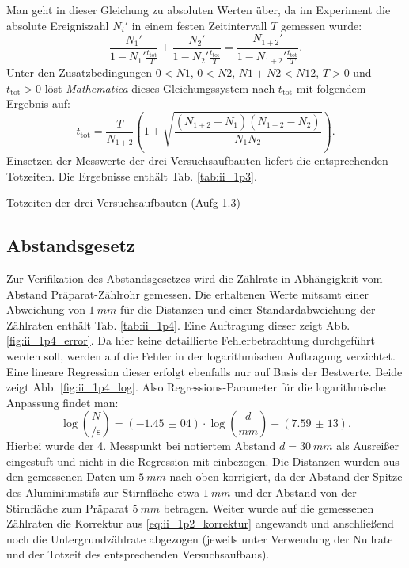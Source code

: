 Man geht in dieser Gleichung zu absoluten Werten über, da im Experiment die absolute Ereigniszahl $N_i'$ in einem festen Zeitintervall $T$ gemessen wurde:
\begin{equation}
\frac{N_1'}{1-N_1'\frac{t_\mathrm{tot}}{T}} + \frac{N_2'}{1-N_2'\frac{t_\mathrm{tot}}{T}} = \frac{N_{1+2}'}{1-N_{1+2}'\frac{t_\mathrm{tot}}{T}}.
\end{equation}
Unter den Zusatzbedingungen $0 < N1$, $0 < N2$, $N1 + N2 < N12$, $T > 0$ und $t_\mathrm{tot} > 0$ löst \textit{Mathematica} dieses Gleichungssystem nach $t_\mathrm{tot}$ mit folgendem Ergebnis auf:
\begin{equation}
t_\mathrm{tot} = \frac{T}{N_{1+2}}\left(1+\sqrt{\frac{(N_{1+2}-N_1)(N_{1+2}-N_2)}{N_1 N_2}}\right).
\end{equation}
Einsetzen der Messwerte der drei Versuchsaufbauten liefert die entsprechenden Totzeiten. Die Ergebnisse enthält Tab. \ref{tab:ii_1p3}.

\begin{table}[tb]
	\centering
	\caption{Totzeiten der drei Versuchsaufbauten (Aufg 1.3)}
	\label{tab:ii_1p3}
	
\end{table}

\subsection{Abstandsgesetz}
Zur Verifikation des Abstandsgesetzes wird die Zählrate in Abhängigkeit vom Abstand Präparat-Zählrohr gemessen. Die erhaltenen Werte mitsamt einer Abweichung von $\SI{1}{mm}$ für die Distanzen und einer Standardabweichung der Zählraten enthält Tab. \ref{tab:ii_1p4}. Eine Auftragung dieser zeigt Abb. \ref{fig:ii_1p4_error}. Da hier keine detaillierte Fehlerbetrachtung durchgeführt werden soll, werden auf die Fehler in der logarithmischen Auftragung verzichtet. Eine lineare Regression dieser erfolgt ebenfalls nur auf Basis der Bestwerte. Beide zeigt Abb. \ref{fig:ii_1p4_log}. Also Regressions-Parameter für die logarithmische Anpassung findet man:
\begin{equation}
\log\left(\frac{N}{\si{\per\second}}\right) = (\num{-1,45(04)}) \cdot \log\left(\frac{d}{\si{mm}}\right) + (\num{7,59(13)}).
\end{equation}
Hierbei wurde der 4. Messpunkt bei notiertem Abstand $d = \SI{30}{mm}$ als Ausreißer eingestuft und nicht in die Regression mit einbezogen. Die Distanzen wurden aus den gemessenen Daten um $\SI{5}{mm}$ nach oben korrigiert, da der Abstand der Spitze des Aluminiumstifs zur Stirnfläche etwa $\SI{1}{mm}$ und der Abstand von der Stirnfläche zum Präparat $\SI{5}{mm}$ betragen. Weiter wurde auf die gemessenen Zählraten die Korrektur aus \eqref{eq:ii_1p2_korrektur} angewandt und anschließend noch die Untergrundzählrate abgezogen (jeweils unter Verwendung der Nullrate und der Totzeit des entsprechenden Versuchsaufbaus).

